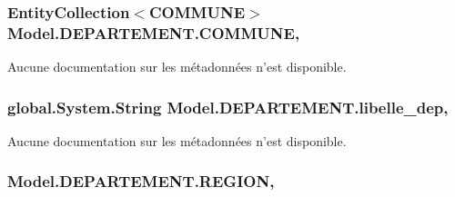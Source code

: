 \hypertarget{class_model_1_1_d_e_p_a_r_t_e_m_e_n_t_a358ff1c2c8c59dcde2585fe932beac03}{
\subsubsection[{C\-O\-M\-M\-U\-N\-E}]{\setlength{\rightskip}{0pt plus 5cm}Entity\-Collection$<${\bf C\-O\-M\-M\-U\-N\-E}$>$ Model.\-D\-E\-P\-A\-R\-T\-E\-M\-E\-N\-T.\-C\-O\-M\-M\-U\-N\-E\hspace{0.3cm}{\ttfamily [get]}, {\ttfamily [set]}}}\label{class_model_1_1_d_e_p_a_r_t_e_m_e_n_t_a358ff1c2c8c59dcde2585fe932beac03}


Aucune documentation sur les métadonnées n'est disponible. 

\hypertarget{class_model_1_1_d_e_p_a_r_t_e_m_e_n_t_aa1736783b4b382723941604c85f83a3f}{
\subsubsection[{libelle\-\_\-dep}]{\setlength{\rightskip}{0pt plus 5cm}global.\-System.\-String Model.\-D\-E\-P\-A\-R\-T\-E\-M\-E\-N\-T.\-libelle\-\_\-dep\hspace{0.3cm}{\ttfamily [get]}, {\ttfamily [set]}}}\label{class_model_1_1_d_e_p_a_r_t_e_m_e_n_t_aa1736783b4b382723941604c85f83a3f}


Aucune documentation sur les métadonnées n'est disponible. 

\hypertarget{class_model_1_1_d_e_p_a_r_t_e_m_e_n_t_ab192797eea7cee21e42260494cce825a}{
\subsubsection[{R\-E\-G\-I\-O\-N}]{ Model.\-D\-E\-P\-A\-R\-T\-E\-M\-E\-N\-T.\-R\-E\-G\-I\-O\-N\hspace{0.3cm}{\ttfamily [get]}, {\ttfamily [set]}}}\label{class_model_1_1_d_e_p_a_r_t_e_m_e_n_t_ab192797eea7cee21e42260494cce825a}


